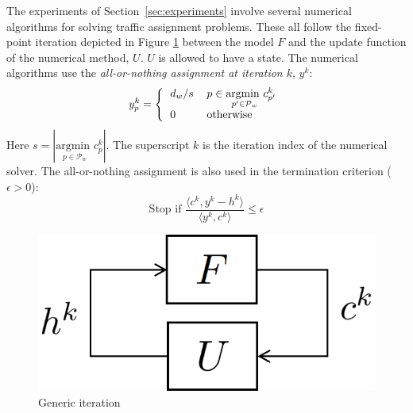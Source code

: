 The experiments of Section~\ref{sec:experiments} involve several numerical algorithms for solving traffic assignment problems. These all follow the fixed-point iteration depicted in Figure \ref{fig:iteartion} between the model $F$ and the update function of the numerical method, $U$. $U$ is allowed to have a state. 
The numerical algorithms use the
\textit{all-or-nothing assignment at iteration $k$},  $y^k$:
\begin{equation}
\label{eq:allornothing}
y^k_p = \left\{
\begin{tabular}{ll}
$d_w/s$ & $p\in\underset{p'\in\mathcal{P}_w}{\text{argmin }} c^k_{p'} $ \\
0 & otherwise
\end{tabular}
\right.
\end{equation}
Here $s=|\underset{p\in\mathcal{P}_w}{\text{argmin }} c^k_{p}|$. The superscript $k$ is the iteration index of the numerical solver.
The all-or-nothing assignment is also used in the  termination criterion ($\epsilon>0$):
\begin{equation}
\label{termination_criterion}
\text{Stop if }
{\frac {\langle c^k,y^k-h^k \rangle} {\langle y^k, c^k\rangle}} \leq \epsilon
\end{equation}

\begin{figure}[h]
    \centering
    \includegraphics[width=0.4\linewidth]{figs/iteration.png}
    \caption{Generic iteration}
    \label{fig:iteartion}
\end{figure}

